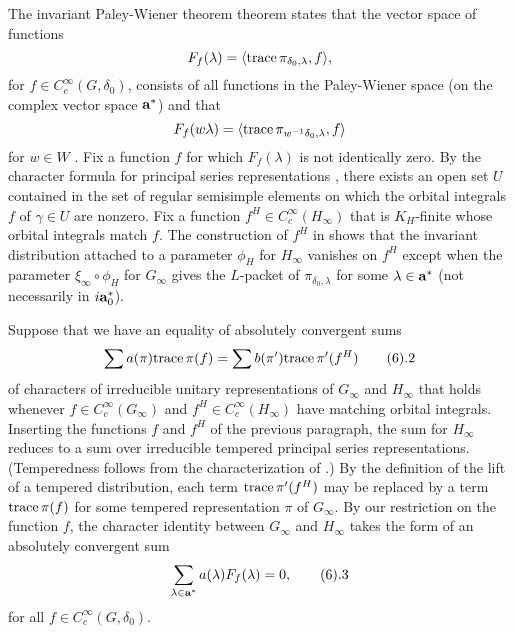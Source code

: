 The invariant Paley-Wiener theorem theorem states that the
vector space of functions
	$$F_f(\lambda) = \langle \tr \pi_{\delta_0,\lambda},f\rangle,$$
for $f\in C_c^\infty(G,\delta_0)$, consists of all functions in the Paley-Wiener
space (on the complex vector space $\aa^*$) 
and that
	$$F_f(w\lambda) = \langle\tr \pi_{w^{-1}\delta_0,\lambda},f\rangle$$
for $w\in W$ \cite{CD}.
Fix a function $f$ for which $F_f(\lambda)$ is not identically
zero.  By the character
formula for principal series representations \cite{Kn,10.18}, there
exists an open set $U$ contained in the set of regular semisimple
elements on which the orbital integrals $f$ of $\gamma\in U$ are nonzero.
Fix a function $f^H \in C_c^\infty(H_\infty)$ that is $K_H$-finite whose
orbital integrals match $f$.  The construction of $f^H$ in \cite{CD,A.4}
shows that the invariant distribution attached to a parameter $\phi_H$
for $H_\infty$ vanishes on $f^H$ except when the parameter
$\xi_\infty\circ\phi_H$ for $G_\infty$ gives the $L$-packet of
$\pi_{\delta_0,\lambda}$ for some $\lambda\in\aa^*$ (not necessarily
in $i\aa_0^*$).

Suppose that we have an equality of absolutely convergent sums
$$\sum a(\pi) \tr \pi(f) = \sum b(\pi') \tr \pi'(f^H)\tag 6.2$$
of characters of irreducible unitary representations of $G_\infty$
and $H_\infty$ that holds whenever $f\in C_c^\infty(G_\infty)$ 
and $f^H\in C_c^\infty(H_\infty)$ have matching
orbital integrals.  Inserting the functions $f$ and $f^H$ of the
previous paragraph, the sum for $H_\infty$ reduces to a sum
over irreducible tempered principal series
representations.  (Temperedness follows from the characterization of
 \cite{Kn,8.53,16.6}.)  By the definition of the lift
of a tempered distribution, each term $\tr\pi'(f^H)$ may
be replaced by a term $\tr\pi(f)$ for some tempered representation $\pi$
of $G_\infty$.  By our restriction on the function $f$, the 
character identity between $G_\infty$ and $H_\infty$ 
takes the form of an
absolutely convergent sum 
	$$\sum_{\lambda\in\aa^*} a(\lambda) F_f(\lambda) = 0,\tag 6.3$$
for all $f\in C_c^\infty(G,\delta_0)$.

